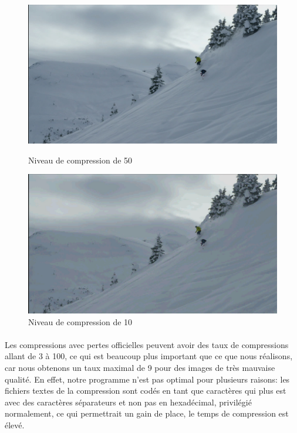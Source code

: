 \documentclass[12pt]{article}
\begin{document}
\begin{figure}[h]
    \begin{minipage}[c]{.46\linewidth}
        \centering
        \includegraphics[scale=0.1]{skilatex50}
        \caption{Niveau de compression de 50}
    \end{minipage}
    \hfill%
    \begin{minipage}[c]{.46\linewidth}
        \centering
        \includegraphics[scale=0.1]{skilatex10}
        \caption{Niveau de compression de 10}
    \end{minipage}
\end{figure}
\paragraph{}
Les compressions avec pertes officielles peuvent avoir des taux de compressions allant de 3 à 100, ce qui est beaucoup plus important que ce que nous réalisons, car nous obtenons un taux maximal de 9 pour des images de très mauvaise qualité. En effet, notre programme n'est pas optimal pour plusieurs raisons: les fichiers textes de la compression sont codés en tant que caractères qui plus est avec des caractères séparateurs et non pas en hexadécimal, privilégié normalement, ce qui permettrait un gain de place, le temps de compression est élevé.
\newpage
\end{document}
